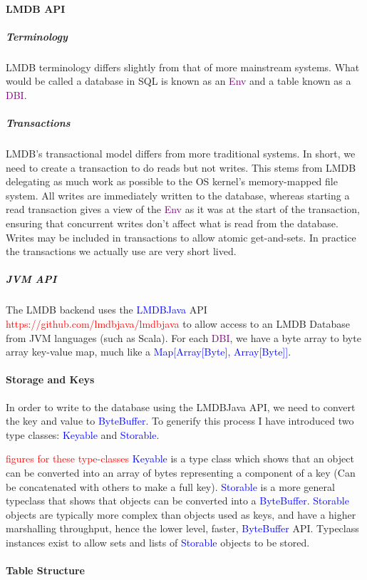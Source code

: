 \documentclass[12pt,a4paper,twoside,openright]{report}
\newcommand\todo[1]{\textcolor{red}{#1}}
\newcommand\codeName[1]{\textcolor{blue}{#1}}
\newcommand\term[1]{\textcolor{purple}{#1}}
\begin{document}
		\paragraph{LMDB API}
			\subparagraph{Terminology}
			LMDB terminology differs slightly from that of more mainstream systems. What would be called a database in SQL is known as an \term{Env} and a table known as a \term{DBI}.
			\subparagraph{Transactions}
				LMDB’s transactional model differs from more traditional systems. In short, we need to create a transaction to do reads but not writes. This stems from LMDB delegating as much work as possible to the OS kernel's memory-mapped file system. All writes are immediately written to the database, whereas starting a read transaction gives a view of the \term{Env} as it was at the start of  the transaction, ensuring that concurrent writes don't affect what is read from the database. Writes may be included in transactions to allow atomic get-and-sets. In practice the transactions we actually use are very short lived.
			\subparagraph{JVM API}
			The LMDB backend uses the \codeName{LMDBJava} API \todo{https://github.com/lmdbjava/lmdbjava} to allow access to an LMDB Database from JVM languages (such as Scala). For each \term{DBI}, we have a byte array to byte array key-value map, much like a \codeName{Map[Array[Byte], Array[Byte]]}.
			
		\paragraph{Storage and Keys}
			In order to write to the database using the LMDBJava API, we need to convert the key and value to \codeName{ByteBuffer}. To generify this process I have introduced two type classes: \codeName{Keyable} and \codeName{Storable}.
			
			\todo{figures for these type-classes}
			 \codeName{Keyable} is a type class which shows that an object can be converted into an array of bytes representing a component of a key (Can be concatenated with others to make a full key). \codeName{Storable} is a more general typeclass that shows that objects can be converted into a \codeName{ByteBuffer}. \codeName{Storable} objects are typically more complex than objects used as keys, and have a higher marshalling throughput, hence the lower level, faster, \codeName{ByteBuffer} API. Typeclass instances exist to allow sets and lists of \codeName{Storable} objects to be stored.	
			
		\paragraph{Table Structure}
	
\end{document}
